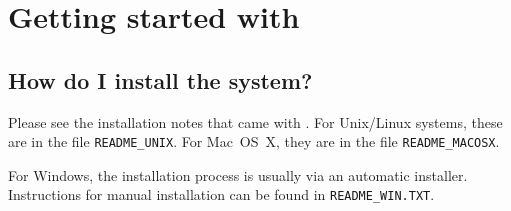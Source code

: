 %
% 
% 
% 
% 
%
%


\newcommand{\guitext}[1]{\mbox{\texttt{#1}}}
\newcommand{\keyboard}[1]{{\texttt{#1}}}
\newcommand{\menu}[1]{\guitext{#1}}
\newcommand{\menuopt}[1]{\guitext{#1}}
\newcommand{\button}[1]{\guitext{#1}}

\newcommand{\ignore}[1]{}

\chapter{Getting started with {\eclipse}}
\label{chapusing}

\section{How do I install the {\eclipse} system?}
Please see the installation notes that came with {\eclipse}.
For Unix/Linux systems, these are in the file \texttt{README_UNIX}.
For Mac~OS~X, they are in the file \texttt{README_MACOSX}.

For Windows, the installation process is usually via an automatic
installer. Instructions for manual installation can be found in
\texttt{README_WIN.TXT}.

